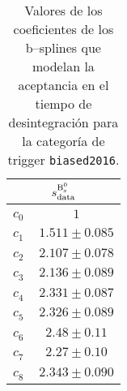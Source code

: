 \begin{table}[H]
\begin{multicols}{3}
\begin{tabular}{cc}
\toprule 
\multicolumn{2}{c}{$s_{\text{data}}^{\mathrm{B}{}_{\mathrm{s}}^{0}}$} \\ \midrule
$ c_0^{\phantom{B}} $&$   1                  $\\
$ c_1^{\phantom{B}}  $&$   1.511 \pm 0.085    $\\
$ c_2^{\phantom{B}}  $&$   2.107 \pm 0.078    $\\
$ c_3^{\phantom{B}}  $&$   2.136 \pm 0.089    $\\
$ c_4^{\phantom{B}}  $&$   2.331 \pm 0.087    $\\
$ c_5^{\phantom{B}}  $&$   2.326 \pm 0.089    $\\
$ c_6^{\phantom{B}}  $&$   2.48  \pm 0.11     $\\
$ c_7^{\phantom{B}}  $&$   2.27  \pm 0.10     $\\
$ c_8^{\phantom{B}}  $&$   2.343 \pm 0.090    $\\
\bottomrule
\end{tabular}

\end{multicols}
\caption{Valores de los coeficientes de los b--splines que modelan la aceptancia en el tiempo de desintegración para la categoría de trigger \texttt{biased2016}.} \label{tab:acctimebsdata}
\end{table}


